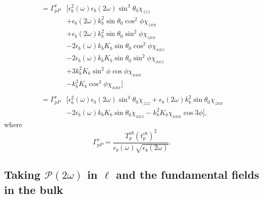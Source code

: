 \begin{equation*}
\begin{split}
= \Gamma^{v}_{pP}&\big[
    \epsilon^{2}_{b}(\omega)\epsilon_{b}
    (2\omega)\sin^{3}\theta_{0}\chi_{zzz}\\
&+  \epsilon_{b}(2\omega)k^{2}_{b}
    \sin\theta_{0}\cos^{2}\phi\chi_{zxx}\\
&+  \epsilon_{b}(2\omega)k^{2}_{b}
    \sin\theta_{0}\sin^{2}\phi\chi_{zxx}\\
&- 2\epsilon_{b}(\omega)k_{b}K_{b}
    \sin\theta_{0}\cos^{2}\phi\chi_{xxz}\\
&- 2\epsilon_{b}(\omega)k_{b}K_{b}
    \sin\theta_{0}\sin^{2}\phi\chi_{xxz}\\
&+ 3k^{2}_{b}K_{b}\sin^{2}\phi\cos\phi\chi_{xxx}\\
&-  k^{2}_{b}K_{b}\cos^{3}\phi\chi_{xxx}
\big]\\\\
= \Gamma^{v}_{pP}&\big[
    \epsilon^{2}_{b}(\omega)\epsilon_{b}(2\omega)
    \sin^{3}\theta_{0}\chi_{zzz}
 +  \epsilon_{b}(2\omega)k^{2}_{b}\sin\theta_{0}\chi_{zxx}\\
&- 2\epsilon_{b}(\omega)k_{b}K_{b}\sin\theta_{0}\chi_{xxz}
 -  k^{2}_{b}K_{b}\chi_{xxx}\cos3\phi
\big],
\end{split}
\end{equation*}
where
\begin{equation*}
\Gamma^{v}_{pP} =
\frac{T^{v b}_{p}\left(t^{v b}_{p}\right)^{2}}
     {\epsilon_{b}(\omega)\sqrt{\epsilon_{b}(2\omega)}}.
\end{equation*}


\subsection{Taking \texorpdfstring{$\mathcal{P}(2\omega)$}{P(2w)} in
\texorpdfstring{$\ell$}{l} and the fundamental fields in the bulk}


